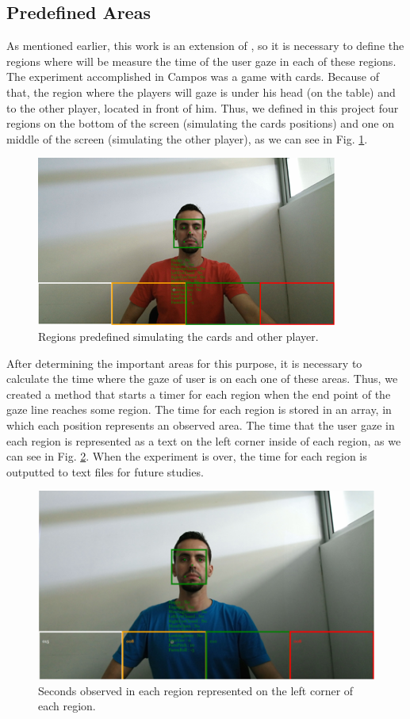 \documentclass[10pt, conference]{IEEEtran}
\begin{document}
\subsection{Predefined Areas}

	As mentioned earlier, this work is an extension of \cite{6}, so it is necessary to define the regions where will be measure the time of the user gaze in each of these regions. 
	The experiment accomplished in Campos was a game with cards. 
	Because of that, the region where the players will gaze is under his head (on the table) and to the other player, located in front of him. 
	Thus, we defined in this project four regions on the bottom of the screen (simulating the cards positions) and one on middle of the screen (simulating the other player), as we can see in Fig. \ref{fig:fig7}.

  \begin{figure}[t]
      \centering
      \includegraphics{figures/pic7.png}
      \caption{Regions predefined simulating the cards and other player.}
      \label{fig:fig7}
  \end{figure}

	After determining the important areas for this purpose, it is necessary to calculate the time where the gaze of user is on each one of these areas. 
	Thus, we created a method that starts a timer for each region when the end point of the gaze line reaches some region. 
	The time for each region is stored in an array, in which each position represents an observed area. 
	The time that the user gaze in each region is represented as a text on the left corner inside of each region, as we can see in Fig. \ref{fig:fig8}. 
	When the experiment is over, the time for each region is outputted to text files for future studies.

    \begin{figure}[t]
        \centering
        \includegraphics{figures/pic8.png}
        \caption{Seconds observed in each region represented on the left corner of each region.}
        \label{fig:fig8}
    \end{figure}
\end{document}
